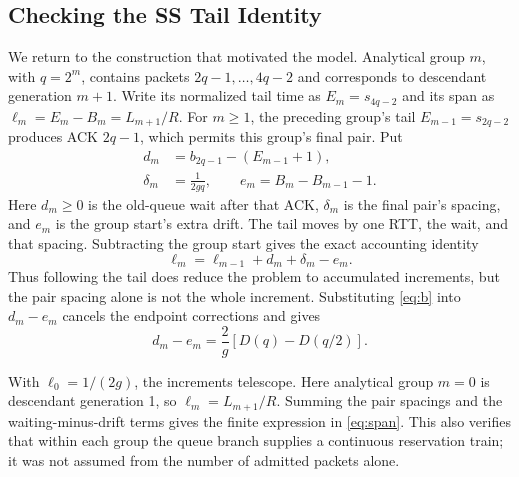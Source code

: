 \documentclass[sigconf,nonacm]{acmart}
\begin{document}
\subsection{Checking the SS Tail Identity}
We return to the construction that motivated the model. Analytical group $m$, with $q=2^m$, contains packets $2q-1,\ldots,4q-2$ and corresponds to descendant generation $m+1$. Write its normalized tail time as $E_m=s_{4q-2}$ and its span as $\ell_m=E_m-B_m=L_{m+1}/R$. For $m\ge1$, the preceding group's tail $E_{m-1}=s_{2q-2}$ produces ACK $2q-1$, which permits this group's final pair. Put
\begin{equation}\begin{aligned}
 d_m&=b_{2q-1}-(E_{m-1}+1),\\
 \delta_m&=\frac1{2gq},\qquad e_m=B_m-B_{m-1}-1.
\end{aligned}\end{equation}
Here $d_m\ge0$ is the old-queue wait after that ACK, $\delta_m$ is the final pair's spacing, and $e_m$ is the group start's extra drift. The tail moves by one RTT, the wait, and that spacing. Subtracting the group start gives the exact accounting identity
\begin{equation}
 \ell_m=\ell_{m-1}+d_m+\delta_m-e_m.\label{eq:tail}
\end{equation}
Thus following the tail does reduce the problem to accumulated increments, but the pair spacing alone is not the whole increment. Substituting \eqref{eq:b} into $d_m-e_m$ cancels the endpoint corrections and gives
\begin{equation}
 d_m-e_m=\frac2g[D(q)-D(q/2)].
\end{equation}

With $\ell_0=1/(2g)$, the increments telescope. Here analytical group $m=0$
is descendant generation 1, so $\ell_m=L_{m+1}/R$. Summing the pair spacings
and the waiting-minus-drift terms gives the finite expression in
\eqref{eq:span}. This also verifies that within each group the queue branch
supplies a continuous reservation train; it was not assumed from the
number of admitted packets alone.
\end{document}
